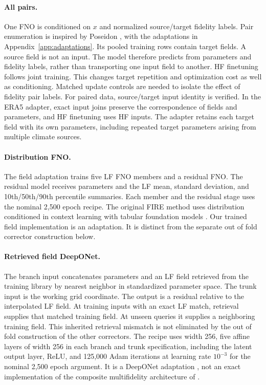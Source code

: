 \paragraph{All pairs.}
One FNO \citep{li2021fno} is conditioned on $x$ and normalized source/target fidelity labels.
Pair enumeration is inspired by Poseidon \citep{herde2024}, with the adaptations in
Appendix~\ref{app:adaptations}.
Its pooled training rows contain target fields. A source field is not an input.
The model therefore predicts from parameters and fidelity labels, rather than
transporting one input field to another. HF finetuning follows joint training.
This changes target repetition and optimization cost as well as conditioning.
Matched update controls are needed to isolate the effect of fidelity pair labels.
For paired data, source/target input identity is verified. In the ERA5 adapter,
exact input joins preserve the correspondence of fields and parameters, and HF finetuning uses HF inputs.
The adapter retains each target field with its own parameters, including repeated target
parameters arising from multiple climate sources.

\paragraph{Distribution FNO.}
The field adaptation trains five LF FNO members and a residual FNO. The residual model
receives parameters and the LF mean, standard deviation, and 10th/50th/90th percentile
summaries. Each member and the residual stage uses the nominal 2,500 epoch recipe.
The original FIRE method uses distribution conditioned in context learning with tabular
foundation models \citep{yu2026fire}. Our trained field implementation is an adaptation.
It is distinct from the separate out of fold corrector construction below.

\paragraph{Retrieved field DeepONet.}
The branch input concatenates parameters and an LF field retrieved from the training
library by nearest neighbor in standardized parameter space. The trunk input is the working grid
coordinate. The output is a residual relative to the interpolated LF field.
At training inputs with an exact LF match, retrieval supplies that matched training field. At unseen queries it supplies a neighboring training field. This inherited retrieval mismatch
is not eliminated by the out of fold construction of the other correctors.
The recipe uses width 256, five affine layers of width 256 in each branch and trunk specification, including
the latent output layer, ReLU,
and 125,000 Adam iterations at learning rate $10^{-3}$ for the nominal 2,500 epoch argument.
It is a DeepONet adaptation \citep{lu2021}, not an exact implementation of the composite
multifidelity architecture of \citet{howard2023}.

